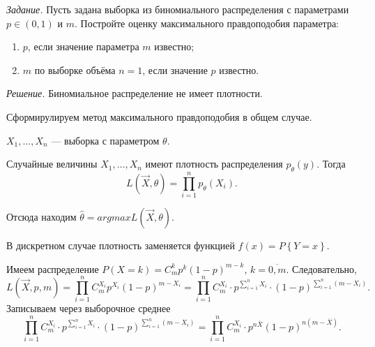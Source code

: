 \textit{Задание.}
Пусть задана выборка из биномиального распределения с параметрами $p \in \left( 0, 1 \right) $ и
$m$.
Постройте оценку максимального правдоподобия параметра:
\begin{enumerate}[label=\alph*)]
  \item $p$, если значение параметра $m$ известно;
  \item $m$ по выборке объёма $n = 1$, если значение $p$ известно.
\end{enumerate}

\textit{Решение.} Биномиальное распределение не имеет плотности.

Сформирулируем метод максимального правдоподобия в общем случае.

$X_1, \dotsc, X_n$ --- выборка с параметром $ \theta $.

Случайные величины $X_1, \dotsc, X_n$ имеют плотность распределения
$p_{ \theta } \left( y \right) $.
Тогда
$$L \left( \vec{X}, \theta \right) =
  \prod \limits_{i = 1}^n p_{ \theta } \left( X_i \right).$$

Отсюда находим $ \hat{ \theta } = argmax L \left( \vec{X}, \theta \right) $.

В дискретном случае плотность заменяется функцией $f \left( x \right) = P \left\{ Y = x \right\} $.

Имеем распределение
$P \left( X = k \right) = C_m^k p^k \left( 1 - p \right)^{m - k}, \,
  k = \overline{0, m}$.
Следовательно,
$$L \left( \vec{X}, p, m \right) =
  \prod \limits_{i = 1}^n C_m^{X_i} p^{X_i} \left( 1 - p \right)^{m - X_i} =
  \prod \limits_{i = 1}^n C_m^{X_i} \cdot
  p^{ \sum \limits_{i = 1}^n X_i} \cdot
  \left( 1 - p \right)^{ \sum \limits_{i = 1}^n \left( m - X_i \right) }.$$
Записываем через выборочное среднее
$$ \prod \limits_{i = 1}^n C_m^{X_i} \cdot
  p^{ \sum \limits_{i = 1}^n X_i} \cdot
  \left( 1 - p \right)^{ \sum \limits_{i = 1}^n \left( m - X_i \right) } =
  \prod \limits_{i = 1}^n C_m^{X_i} \cdot
  p^{n \overline{X}} \left( 1 - p \right)^{n \left( m - \overline{X} \right) }.$$

